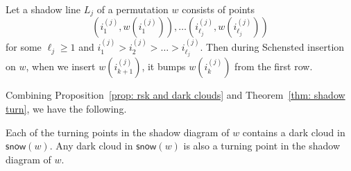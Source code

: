 \documentclass[ALCO]{cedram}
\newcommand{\snow}{\mathsf{snow}}
\begin{document}
\begin{ourthm}\label{thm: shadow turn}
Let a shadow line $L_j$ of a permutation $w$ consists of points
\[
\left(i^{(j)}_1,w(i^{(j)}_1)\right),\dots \left(i^{(j)}_{\ell_j},w(i^{(j)}_{\ell_j})\right)
\]
for some $\ell_j \geqslant 1$ and $i^{(j)}_1>i^{(j)}_2>\dots>i^{(j)}_{\ell_j}$. 
Then during Schensted insertion on $w$, when we insert $w(i^{(j)}_{k+1})$,
it bumps $w(i^{(j)}_{k})$ from the first row.
\end{ourthm}
 
Combining Proposition~\ref{prop: rsk and dark clouds} and Theorem~\ref{thm: shadow turn}, we have the following.

\begin{cor}
Each of the turning points in the shadow diagram of $w$ contains a dark cloud in $\snow(w)$. Any dark cloud in $\snow(w)$ is also a turning point in the shadow diagram of $w$.
\end{cor}
\end{document}
